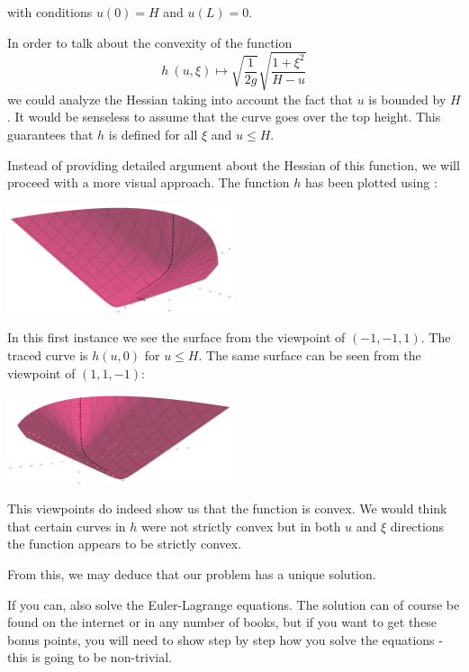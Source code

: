 \documentclass[12pt]{memoir}
\begin{document}
\begin{ptcbr}
with conditions $u(0)=H$ and $u(L)=0$.\par 
In order to talk about the convexity of the function 
$$h\: (u,\xi)\mapsto \sqrt{\frac{1}{2g}}\sqrt{\frac{1+\xi^2}{H-u}}$$
we could analyze the Hessian taking into account the fact that $u$ is bounded by $H$. It would be senseless to assume that the curve goes over the top height. This guarantees that $h$ is defined for all $\xi$ and $u\leq H$.\par
Instead of providing detailed argument about the Hessian of this function, we will proceed with a more visual approach. The function $h$ has been plotted using :
\begin{center}
    \includegraphics[width=0.5\textwidth]{fig1HW3Vari.png}    
\end{center}
In this first instance we see the surface from the viewpoint of $(-1,-1,1)$. The traced curve is $h(u,0)$ for $u\leq H$. The same surface can be seen from the viewpoint of $(1,1,-1)$:
\begin{center}
    \includegraphics[width=0.5\textwidth]{fig2HW3Vari.png}    
\end{center}
This viewpoints do indeed show us that the function is convex. We would think that certain curves in $h$ were not strictly convex but in both $u$ and $\xi$ directions the function appears to be strictly convex.\par 
From this, we may deduce that our problem has a unique solution.
\end{ptcbr}

\begin{nonum-Ej}
    If you can, also solve the Euler-Lagrange equations. The solution can of course be found on the internet
or in any number of books, but if you want to get these bonus points, you will need to show step by step
how you solve the equations - this is going to be non-trivial.
\end{nonum-Ej}
\end{document}
